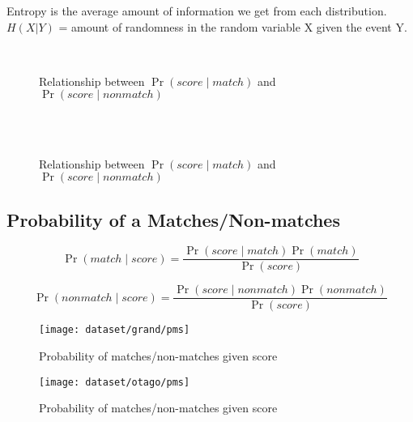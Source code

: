 Entropy is the average amount of information we get from each distribution.
$H(X|Y)$ = amount of randomness in the random variable X given the event Y.

\begin{figure}[htbp]
  \centering
  \label{fig:grand_ent_psm}\\ %
  \caption{Relationship between $\Pr{(score \mid match)}$ and $\Pr{(score \mid nonmatch)}$}
  \label{fig:grand_ent_psnm} %
\end{figure}

\begin{figure}[htbp]
  \centering
  \label{fig:otago_ent_psm}\\ %
  \label{fig:otago_ent_psnm}\\ %
  \caption{Relationship between $\Pr{(score \mid match)}$ and $\Pr{(score \mid nonmatch)}$}
  \label{fig:emd_grand} %
\end{figure}

\FloatBarrier%
\subsection{Probability of a Matches/Non-matches}

$$\Pr{(match \mid score)} = \frac{\Pr{(score \mid match)}\Pr{(match)}}
    {\Pr{(score)}}$$

$$\Pr{(nonmatch \mid score)} = \frac{\Pr{(score \mid nonmatch)}\Pr{(nonmatch)}}
    {\Pr{(score)}}$$

\begin{figure}[htbp]
  \centering
  \texttt{[image: dataset/grand/pms]}
  \caption{Probability of matches/non-matches given score}
  \label{fig:grand_pms} %
\end{figure}

\begin{figure}[htbp]
  \centering
  \texttt{[image: dataset/otago/pms]}
  \caption{Probability of matches/non-matches given score}
  \label{fig:otago_pms} %
\end{figure}

